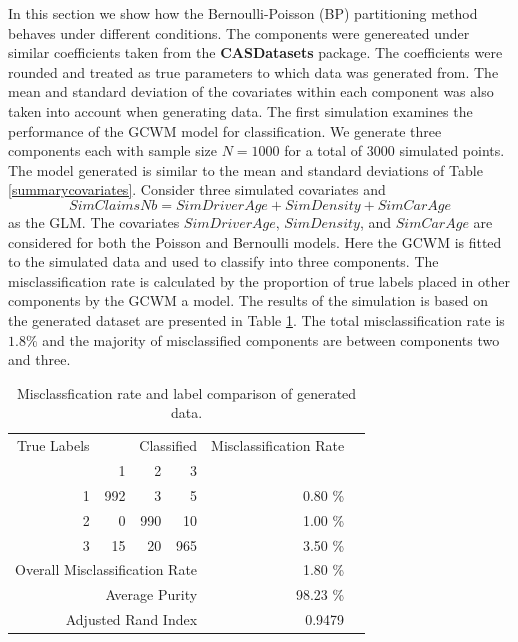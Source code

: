 \documentclass[11pt,letterpaper]{article}
\numberwithin{equation}{section}
\numberwithin{equation}{section}
\numberwithin{equation}{section}
\begin{document}
In this section we show how the Bernoulli-Poisson (BP) partitioning method behaves under different conditions. The components were genereated under similar coefficients taken from the \textbf{CASDatasets} package. The coefficients were rounded and treated as true parameters to which data was generated from. The mean and standard deviation of the covariates within each component was also taken into account when generating data. The first simulation examines the performance of the GCWM model for classification. We generate three components each with sample size $N=1000$ for a total of $3000$ simulated points.
The model generated is similar to the mean and standard deviations of Table \ref{summarycovariates}. Consider three simulated covariates and 
\begin{equation}
SimClaimsNb = SimDriverAge + SimDensity + SimCarAge 
\end{equation}
as the GLM. The covariates $SimDriverAge$, $SimDensity$, and $SimCarAge$ are considered for both the Poisson and Bernoulli models. 
 Here the GCWM is fitted to the simulated data and used to classify into three components. The misclassification rate is calculated by the proportion of true labels placed in other components by the GCWM a model.  The results of the simulation is based on the generated dataset are presented in Table \ref{misclassTable}. The total misclassification rate  is $1.8 \% $ and the majority of misclassified components are between components two and three.
\begin{table}[!htb]
\begin{center}
\caption{Misclassfication rate and label comparison of generated data.}
\label{misclassTable}
\begin{tabular}{r r r r r r}
\hline\hline
    True Labels       &  \multicolumn{3}{r}{ Classified }   & Misclassification Rate  &  \\ \cmidrule{2-4}
   & 1                              & 2   & 3   &                            &  \\ \hline
1              & 992                            & 3   & 5   & 0.80 \%                                      &  \\
2              & 0                              & 990 & 10  & 1.00 \%                                       &  \\
3              & 15                             & 20  & 965 & 3.50 \%                                      &  \\  \hline
                \multicolumn{4}{r}{Overall Misclassification Rate}        & 1.80 \%                  & \\
        		\multicolumn{4}{r}{Average Purity} & 98.23 \%  
        		\\ \hline
                \multicolumn{4}{r}{Adjusted Rand Index} & 0.9479 &  \\
    \hline\hline
\end{tabular}
\end{center}
\end{table}
\end{document}

